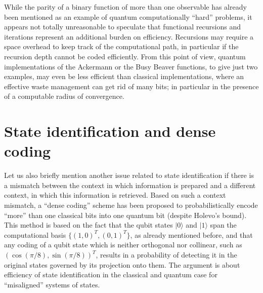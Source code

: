 While the parity of a binary function
of more than one observable has already been mentioned
as an example of quantum computationally ``hard'' problems,
it appears not totally unreasonable to speculate  that functional recursions
and iterations
represent an additional burden on efficiency.
Recursions may require
a space overhead to keep track of the computational path,
in particular if the recursion depth cannot be coded efficiently.
From this point of view,
quantum implementations of the Ackermann or the Busy Beaver functions,
to give just two examples,
may even be less efficient than classical implementations,
where an effective waste management can get rid of many bits;
in particular in the presence of a computable radius of convergence.


\section{State identification and dense coding}
Let us also briefly mention another issue related to state identification
if there is a mismatch between the context in which
information is prepared and a different context, in which this information
is retrieved.
Based on such a context mismatch,
a ``dense coding'' scheme has been proposed \cite{581773}
to probabilistically encode ``more'' than one
classical bits into one quantum bit (despite Holevo's bound).
This method is based on the fact that the qubit states
$\vert 0\rangle$
and
$\vert 1\rangle$
span the computational basis
$\{ (1,0)^T,(0,1)^T\}$, as already mentioned before,
and that any coding of a qubit state which is neither orthogonal nor
collinear, such as $(\cos (\pi /8),\sin (\pi /8))^T$,
results in a probability of detecting it in the
original states governed by its projection onto them.
The argument is about efficiency of state identification in the classical
and quantum case for ``misaligned'' systems of states.


